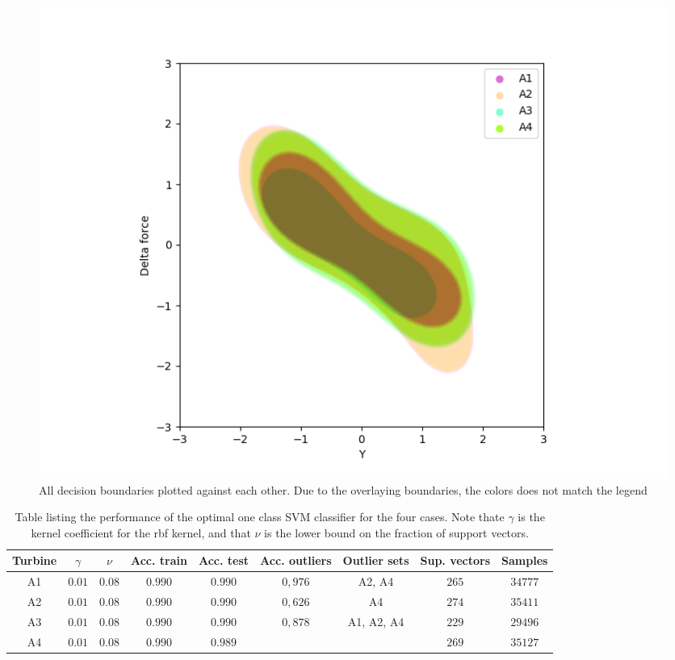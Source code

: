             
            \begin{figure}[]
                \centering
                \includegraphics[scale=0.6]{figures/analysis/oneclass_servo/One_Class_SVM_servoIndication.png}
                \caption{All decision boundaries plotted against each other. Due to the overlaying boundaries, the colors does not match the legend}
                \label{fig:all_classes_servo_oneclass}
            \end{figure}
            
            \begin{table}[]
                \centering
                \begin{tabular}{|c|c|c|c|c|c|c|c|c|}
                    \hline
                    Turbine &$\gamma$   & $\nu$     & Acc. train    & Acc. test &Acc. outliers  & Outlier sets  & Sup. vectors  & Samples  \\ \hline
                    A1      & $0.01$    & $0.08$    & $0.990$       & $0.990$   & $0,976$       & A2, A4        &$265$         & $34777$\\ \hline
                    A2      & $0.01$    & $0.08$    & $0.990$       & $0.990$   & $0,626$       & A4            &$274$         & $35411$\\ \hline
                    A3      & $0.01$    & $0.08$    & $0.990$       & $0.990$   & $0,878$       & A1, A2, A4    &$229$         & $29496$\\ \hline
                    A4      & $0.01$    & $0.08$    & $0.990$       & $0.989$   &               &               &$269$         & $35127$\\ \hline
                \end{tabular}
                \caption{Table listing the performance of the optimal one class SVM classifier for the four cases. Note thate $\gamma$ is the kernel coefficient for the rbf kernel, and that $\nu$ is the lower bound on the fraction of support vectors. }
                \label{tab:one_class_servo}
            \end{table}
            
